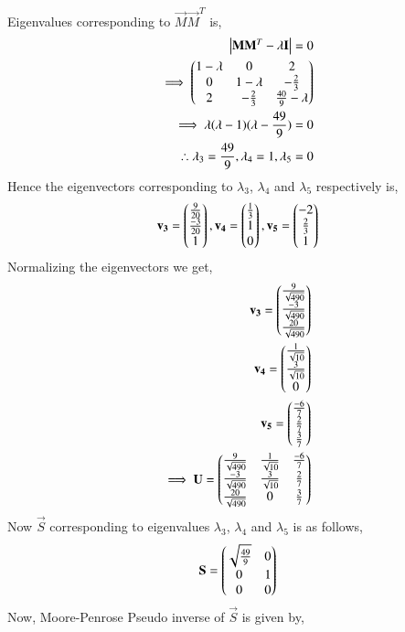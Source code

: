 \documentclass[journal,12pt,twocolumn]{IEEEtran}
\begin{document}
Eigenvalues corresponding to $\vec{M}\vec{M}^T$  is,
\begin{align}
\begin{vmatrix}\mathbf{M}\mathbf{M}^T-\lambda\mathbf{I}\end{vmatrix} = 0\\
\implies \begin{pmatrix}1-\lambda&0&2\\0&1-\lambda&-\frac{2}{3}\\2&-\frac{2}{3}&\frac{40}{9}-\lambda\end{pmatrix}\\
\implies \lambda(\lambda-1)(\lambda-\frac{49}{9}) = 0\\
\therefore \lambda_3 = \frac{49}{9}, \lambda_4 = 1, \lambda_5 = 0\label{eq:lambda5}
\end{align} 
Hence the eigenvectors corresponding to $\lambda_3$, $\lambda_4$ and  $\lambda_5$ respectively is,
\begin{align}
\mathbf{v_3} =\begin{pmatrix}\frac{9}{20}\\\frac{-3}{20}\\1\end{pmatrix},
\mathbf{v_4} =\begin{pmatrix}\frac{1}{3}\\1\\0\end{pmatrix},
\mathbf{v_5} = \begin{pmatrix}-2\\\frac{2}{3}\\1\end{pmatrix}
\end{align}
Normalizing the eigenvectors we get,
\begin{align}
\mathbf{v_3} = \begin{pmatrix}\frac{9}{\sqrt{490}}\\\frac{-3}{\sqrt{490}}\\\frac{20}{\sqrt{490}}\end{pmatrix}\\
\mathbf{v_4} = \begin{pmatrix}\frac{1}{\sqrt{10}}\\\frac{3}{\sqrt{10}}\\0\end{pmatrix}\\
\mathbf{v_5} = \begin{pmatrix}\frac{-6}{7}\\\frac{2}{7}\\\frac{3}{7}\end{pmatrix}\\
\implies \mathbf{U} = \begin{pmatrix}\frac{9}{\sqrt{490}} &\frac{1}{\sqrt{10}} & \frac{-6}{7}\\\frac{-3}{\sqrt{490}} &\frac{3}{\sqrt{10}} &\frac{2}{7} \\\frac{20}{\sqrt{490}}&0& \frac{3}{7}\end{pmatrix} \label{eq:U}
\end{align} 
Now $\vec{S}$ corresponding to eigenvalues $\lambda_3$, $\lambda_4$ and  $\lambda_5$ is as follows,
\begin{align}
\mathbf{S} = \begin{pmatrix}\sqrt{\frac{49}{9}}&0\\0&1\\0&0\end{pmatrix}
\end{align}
Now, Moore-Penrose Pseudo inverse of $\vec{S}$ is given by,
\end{document}
